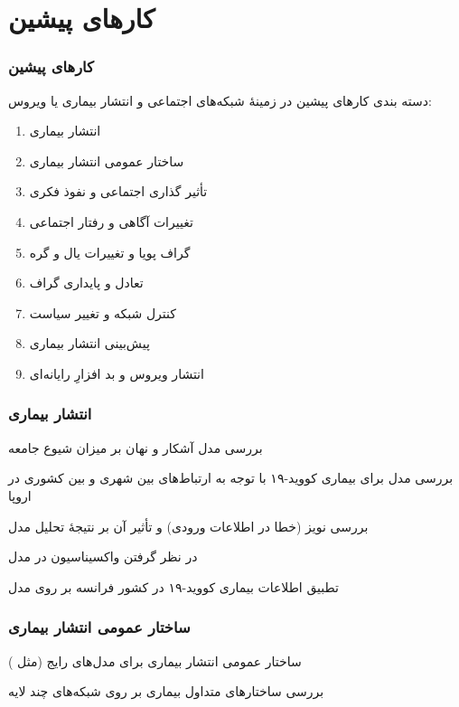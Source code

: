 \documentclass[xcolor=dvipsnames, professionalfonts, aspectratio=169, 11pt]{beamer}
\begin{document}
\section{کارهای پیشین}
\begin{frame}
    \frametitle{کارهای پیشین}

    دسته بندی کارهای پیشین در زمینهٔ شبکه‌های اجتماعی و انتشار بیماری  یا ویروس:
    {
    \begin{enumerate}\RTList
        \item<1-2> انتشار بیماری
        \item ساختار عمومی انتشار بیماری
        \item تأثیر گذاری اجتماعی و نفوذ فکری
        \item تغییرات آگاهی و رفتار اجتماعی
        \item<1> گراف پویا و تغییرات یال و گره
        \item<1> تعادل و پایداری گراف
        \item<1> کنترل شبکه و تغییر سیاست
        \item<1> پیش‌بینی انتشار بیماری
        \item<1> انتشار ویروس و بد افزارِ رایانه‌ای

    \end{enumerate}
    }
\end{frame}

\begin{frame}
    \frametitle{انتشار بیماری}

    \begin{moredi}
        \item بررسی مدل آشکار و نهان بر میزان شیوع جامعه \cite{chen2020time}
        \item بررسی مدل  برای بیماری کووید-۱۹ با توجه به ارتباط‌های بین شهری و بین کشوری در اروپا \cite{wang2019coevolution,estrada2020covid}
        \item بررسی نویز (خطا در اطلاعات ورودی) و تأثیر آن بر نتیجهٔ تحلیل مدل  \cite{vizuete2020graphon}
        \item در نظر گرفتن واکسیناسیون در مدل  \cite{khanjanianpak2020competition}
        \item تطبیق اطلاعات بیماری کووید-۱۹ در کشور فرانسه بر روی مدل  \cite{efimov2020interval}
    \end{moredi}

\end{frame}

\begin{frame}
    \frametitle{ساختار عمومی انتشار بیماری}

    \begin{moredi}
        \item ساختار عمومی انتشار بیماری برای مدل‌های رایج (مثل ) \cite{moon2020group}
        \item بررسی ساختارهای متداول بیماری بر روی شبکه‌های چند لایه \cite{abhishek2020sis}
    \end{moredi}

\end{frame}
\end{document}
